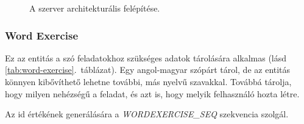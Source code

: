\documentclass[11pt, a4paper]{article}
\begin{document}
    \begin{figure}[htbp]
    	\center
    	\caption{A szerver architekturális felépítése.}
    	\label{fig:er_diag}
    \end{figure}
    
    \subsubsection{Word Exercise}
    Ez az entitás a szó feladatokhoz szükséges adatok tárolására alkalmas (lásd \ref{tab:word-exercise}.~táblázat). Egy angol-magyar szópárt tárol, de az entitás könnyen kibővíthető lehetne további, más nyelvű szavakkal. Továbbá tárolja, hogy milyen nehézségű a feladat, és azt is, hogy melyik felhasználó hozta létre.
    
    Az id értékének generálására a \textit{WORDEXERCISE\_SEQ} szekvencia szolgál.
    
\end{document}
